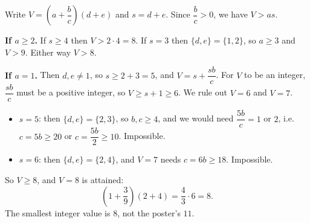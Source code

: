 Write $V=\left(a+\dfrac{b}{c}\right)(d+e)$ and $s=d+e$. Since $\dfrac{b}{c}>0$, we have $V>as$.

\textbf{If $a\ge2$.} If $s\ge4$ then $V>2\cdot4=8$. If $s=3$ then $\{d,e\}=\{1,2\}$, so $a\ge3$ and $V>9$. Either way $V>8$.

\textbf{If $a=1$.} Then $d,e\ne1$, so $s\ge2+3=5$, and $V=s+\dfrac{sb}{c}$. For $V$ to be an integer, $\dfrac{sb}{c}$ must be a positive integer, so $V\ge s+1\ge6$. We rule out $V=6$ and $V=7$.
\begin{itemize}
\item $s=5$: then $\{d,e\}=\{2,3\}$, so $b,c\ge4$, and we would need $\dfrac{5b}{c}=1$ or $2$, i.e.\ $c=5b\ge20$ or $c=\dfrac{5b}{2}\ge10$. Impossible.
\item $s=6$: then $\{d,e\}=\{2,4\}$, and $V=7$ needs $c=6b\ge18$. Impossible.
\end{itemize}
So $V\ge8$, and $V=8$ is attained:
\[
\left(1+\dfrac{3}{9}\right)(2+4)=\dfrac{4}{3}\cdot6=8 .
\]
The smallest integer value is $\boxed{8}$, not the poster's $11$.
